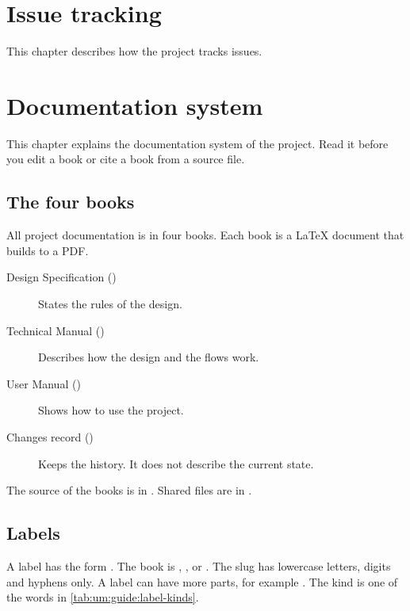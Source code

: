 \chapter{Issue tracking}\label{um:ch:issue-tracking}

This chapter describes how the project tracks issues.

\chapter{Documentation system}\label{um:ch:documentation-system}

This chapter explains the documentation system of the project. Read it before you edit a book or cite a book from a source file.

\section{The four books}
All project documentation is in four books. Each book is a LaTeX document that builds to a PDF.
\begin{description}
  \item[Design Specification ()] States the rules of the design.
  \item[Technical Manual ()] Describes how the design and the flows work.
  \item[User Manual ()] Shows how to use the project.
  \item[Changes record ()] Keeps the history. It does not describe the current state.
\end{description}
The source of the books is in . Shared files are in .

\section{Labels}
A label has the form . The book is , ,  or . The slug has lowercase letters, digits and hyphens only. A label can have more parts, for example .
The kind is one of the words in \cref{tab:um:guide:label-kinds}.

